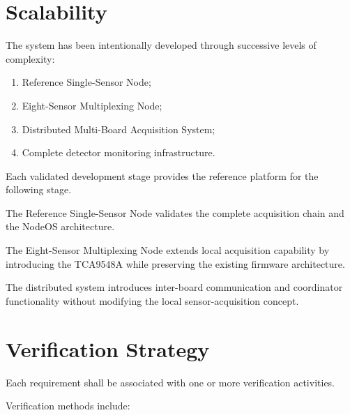 \section{Scalability}

The system has been intentionally developed through successive levels of complexity:

\begin{enumerate}[leftmargin=*]
	
	\item Reference Single-Sensor Node;
	
	\item Eight-Sensor Multiplexing Node;
	
	\item Distributed Multi-Board Acquisition System;
	
	\item Complete detector monitoring infrastructure.
	
\end{enumerate}

Each validated development stage provides the reference platform for the following stage.

The Reference Single-Sensor Node validates the complete acquisition chain and the NodeOS architecture.

The Eight-Sensor Multiplexing Node extends local acquisition capability by introducing the TCA9548A while preserving the existing firmware architecture.

The distributed system introduces inter-board communication and coordinator functionality without modifying the local sensor-acquisition concept.

\section{Verification Strategy}

Each requirement shall be associated with one or more verification activities.

Verification methods include:

